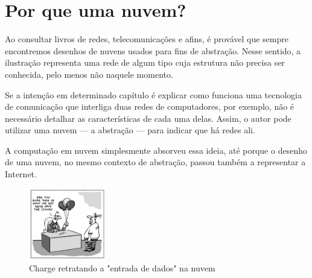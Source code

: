 \section{Por que uma nuvem?}

Ao consultar livros de redes, telecomunicações e afins, é provável que sempre
encontremos desenhos de nuvens usados para fins de abstração. Nesse sentido, a
ilustração representa uma rede de algum tipo cuja estrutura não precisa ser
conhecida, pelo menos não naquele momento.

Se a intenção em determinado capítulo é explicar como funciona uma tecnologia de
comunicação que interliga duas redes de computadores, por exemplo, não é
necessário detalhar as características de cada uma delas. Assim, o autor pode
utilizar uma nuvem --- a abstração --- para indicar que há redes ali.

A computação em nuvem simplesmente absorveu essa ideia, até porque o desenho de
uma nuvem, no mesmo contexto de abstração, passou também a representar a
Internet.

\begin{figure}[ht]
    \centering
    \includegraphics[width=0.3\textwidth]{img/comic.jpg}
    \caption{Charge retratando a "entrada de dados" na nuvem}
\end{figure}
